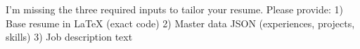 I’m missing the three required inputs to tailor your resume. Please provide:
1) Base resume in LaTeX (exact code)
2) Master data JSON (experiences, projects, skills)
3) Job description text